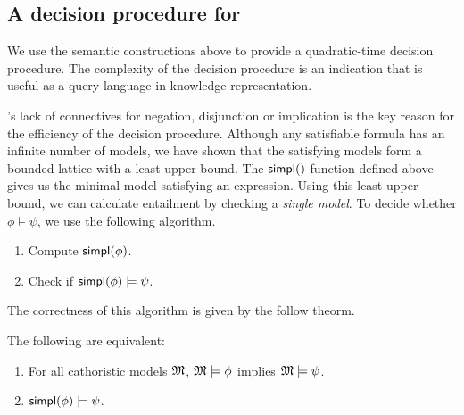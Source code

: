 \subsection{A decision procedure for \cathoristic{}}\label{decisionprocedure}

We use the semantic constructions above to provide a quadratic-time
decision procedure.  The complexity of the decision procedure is an
indication that \cathoristic{} is useful as a query language in knowledge
representation.

\Cathoristic{}'s lack of connectives for negation, disjunction or
implication is the key reason for the efficiency of the decision
procedure.  Although any satisfiable formula has an infinite number of
models, we have shown that the satisfying models form a bounded
lattice with a least upper bound.  The $\SIMPL$ function defined above
gives us the minimal model satisfying an expression.  Using this least
upper bound, we can calculate entailment by checking a \emph{single
  model}.  To decide whether $\phi \models \psi$, we use the following
algorithm.

\begin{enumerate}

\item Compute $\mathsf{simpl}(\phi)$.

\item Check if $\mathsf{simpl}(\phi) \models \psi$.

\end{enumerate}

\NI The correctness of this algorithm is given by the follow theorm.

\begin{theorem}\label{theorem:decision}
  The following are equivalent:
  \begin{enumerate}
    \item\label{theorem:decision:1} For all cathoristic models $\frak{M}$,
      $\frak{M} \models \phi$ implies $\frak{M} \models \psi$.
    \item\label{theorem:decision:2} $\mathsf{simpl}(\phi) \models \psi$.
  \end{enumerate}
\end{theorem}

